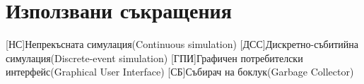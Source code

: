 \appendix
\chapter{Използвани съкращения}
	\begin{acronym}[JDK]
		[НС]{Непрекъсната симулация(Continuous simulation)}
		[ДСС]{Дискретно-събитийна симулация(Discrete-event simulation)}
		[ГПИ]{Графичен потребителски интерфейс(Graphical User Interface)}
		[СБ]{Събирач на боклук(Garbage Collector)}
	\end{acronym}